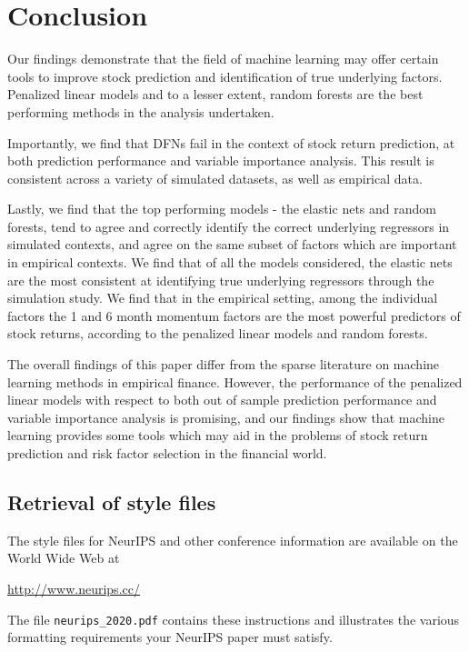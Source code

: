 \documentclass{article}
\begin{document}
\section{Conclusion}

Our findings demonstrate that the field of machine learning may offer certain tools to improve stock prediction and identification of true underlying factors. Penalized linear models and to a lesser extent, random forests are the best performing methods in the analysis undertaken.

Importantly, we find that DFNs fail in the context of stock return prediction, at both prediction performance and variable importance analysis. This result is consistent across a variety of simulated datasets, as well as empirical data. 

Lastly, we find that the top performing models - the elastic nets and random forests, tend to agree and correctly identify the correct underlying regressors in simulated contexts, and agree on the same subset of factors which are important in empirical contexts. We find that of all the models considered, the elastic nets are the most consistent at identifying true underlying regressors through the simulation study. We find that in the empirical setting, among the individual factors the 1 and 6 month momentum factors are the most powerful predictors of stock returns, according to the penalized linear models and random forests. 

The overall findings of this paper differ from the sparse literature on machine learning methods in empirical finance. However, the performance of the penalized linear models with respect to both out of sample prediction performance and variable importance analysis is promising, and our findings show that machine learning provides some tools which may aid in the problems of stock return prediction and risk factor selection in the financial world. 

\newpage

\subsection{Retrieval of style files}

The style files for NeurIPS and other conference information are available on
the World Wide Web at
\begin{center}
  \url{http://www.neurips.cc/}
\end{center}
The file \verb+neurips_2020.pdf+ contains these instructions and illustrates the
various formatting requirements your NeurIPS paper must satisfy.
\end{document}
